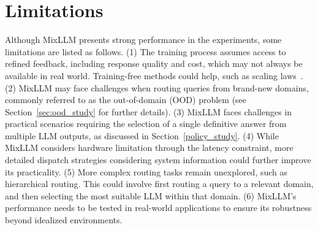 \section*{Limitations}

Although MixLLM presents strong performance in the experiments, some limitations are listed as follows.
(1) The training process assumes access to refined feedback, including response quality and cost, which may not always be available in real world. Training-free methods could help, such as scaling laws~\cite{ruan2024observational}.
(2) MixLLM may face challenges when routing queries from brand-new domains, commonly referred to as the out-of-domain (OOD) problem (see Section~\ref{sec:ood_study} for further details).
(3) MixLLM faces challenges in practical scenarios requiring the selection of a single definitive answer from multiple LLM outputs, as discussed in Section~\ref{policy_study}.
(4) While MixLLM considers hardware limitation through the latency constraint, more detailed dispatch strategies considering system information could further improve its practicality.
(5) More complex routing tasks remain unexplored, such as hierarchical routing. This could involve first routing a query to a relevant domain, and then selecting the most suitable LLM within that domain.
(6) MixLLM’s performance needs to be tested in real-world applications to ensure its robustness beyond idealized environments.

